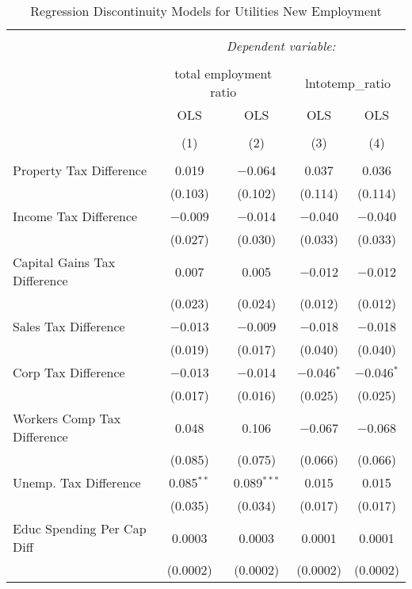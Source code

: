 
\begin{table}[!htbp] \centering 
  \caption{Regression Discontinuity Models for  Utilities New Employment} 
  \label{22rd} 
\begin{tabular}{@{\extracolsep{5pt}}lcccc} 
\\[-1.8ex]\hline 
\hline \\[-1.8ex] 
 & \multicolumn{4}{c}{\textit{Dependent variable:}} \\ 
\cline{2-5} 
\\[-1.8ex] & \multicolumn{2}{c}{total employment ratio} & \multicolumn{2}{c}{lntotemp\_ratio} \\ 
 & OLS & OLS & OLS & OLS \\ 
\\[-1.8ex] & (1) & (2) & (3) & (4)\\ 
\hline \\[-1.8ex] 
 Property Tax Difference & 0.019 & $-$0.064 & 0.037 & 0.036 \\ 
  & (0.103) & (0.102) & (0.114) & (0.114) \\ 
  Income Tax Difference & $-$0.009 & $-$0.014 & $-$0.040 & $-$0.040 \\ 
  & (0.027) & (0.030) & (0.033) & (0.033) \\ 
  Capital Gains Tax Difference & 0.007 & 0.005 & $-$0.012 & $-$0.012 \\ 
  & (0.023) & (0.024) & (0.012) & (0.012) \\ 
  Sales Tax Difference & $-$0.013 & $-$0.009 & $-$0.018 & $-$0.018 \\ 
  & (0.019) & (0.017) & (0.040) & (0.040) \\ 
  Corp Tax Difference & $-$0.013 & $-$0.014 & $-$0.046$^{*}$ & $-$0.046$^{*}$ \\ 
  & (0.017) & (0.016) & (0.025) & (0.025) \\ 
  Workers Comp Tax Difference & 0.048 & 0.106 & $-$0.067 & $-$0.068 \\ 
  & (0.085) & (0.075) & (0.066) & (0.066) \\ 
  Unemp. Tax Difference & 0.085$^{**}$ & 0.089$^{***}$ & 0.015 & 0.015 \\ 
  & (0.035) & (0.034) & (0.017) & (0.017) \\ 
  Educ Spending Per Cap Diff & 0.0003 & 0.0003 & 0.0001 & 0.0001 \\ 
  & (0.0002) & (0.0002) & (0.0002) & (0.0002) \\ 

\end{tabular}
\end{table}
